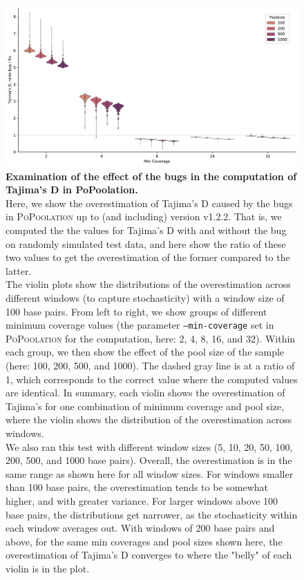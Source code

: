 \documentclass[a4paper,fontsize=9pt,DIV=14]{scrartcl}
\newcommand\toolname{\textsc}
\begin{document}
\begin{figure}[p]
    \centering
    \includegraphics[width=\linewidth]{figures/bug-exam/window-100.pdf}
    \vspace*{-1em}
    \caption{
        \textbf{Examination of the effect of the bugs in the computation of Tajima's D in PoPoolation.}
        \\
        Here, we show the overestimation of Tajima's D caused by the bugs in \toolname{PoPoolation} up to (and including) version v1.2.2. That is, we computed the the values for Tajima's D with and without the bug on randomly simulated test data, and here show the ratio of these two values to get the overestimation of the former compared to the latter. 
        \\
        The violin plots show the distributions of the overestimation across different windows (to capture stochasticity) with a window size of 100 base pairs. From left to right, we show groups of different minimum coverage values (the parameter \texttt{--min-coverage} set in \toolname{PoPoolation} for the computation, here: 2, 4, 8, 16, and 32). Within each group, we then show the effect of the pool size of the sample (here: %
        100, 200, 500, and 1000). %
        The dashed gray line is at a ratio of 1, which corresponds to the correct value where the computed values are identical.
        In summary, each violin shows the overestimation of Tajima's for one combination of minimum coverage and pool size, where the violin shows the distribution of the overestimation across windows.
        \\
        We also ran this test with different window sizes (5, 10, 20, 50, 100, 200, 500, and 1000 base pairs). Overall, the overestimation is in the same range as shown here for all window sizes. For windows smaller than 100 base pairs, the overestimation tends to be somewhat higher, and with greater variance. For larger windows above 100 base pairs, the distributions get narrower, as the stochasticity within each window averages out. With windows of 200 base pairs and above, for the same min coverages and pool sizes shown here, the overestimation of Tajima's D converges to where the "belly" of each violin is in the plot.
}
\end{figure}
\end{document}
